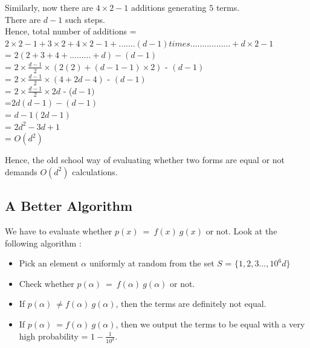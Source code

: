 \documentclass{llncs}
\begin{document}
Similarly, now there are $4 \times 2 -1$ additions generating $5$ terms. \\

There are $d-1$ such steps.\\

Hence, total number of additions = $2 \times 2 - 1 + 3 \times 2+ 4 \times 2 - 1 + .......(d-1) times................. + d \times 2 - 1   $\\

= $2 (2 + 3 + 4 + ......... + d ) - (d-1)$\\

= $2 \times \frac{d-1}{2} \times (2 (2) + (d-1-1) \times 2)$ - $(d-1)$\\

= $2 \times \frac{d-1}{2} \times (4 + 2d - 4)$ - $(d -1) $\\

= $2 \times \frac{d-1}{2} \times 2d$ - ($d -1) $\\

=$2 d (d - 1) - ( d - 1)$\\

= $ d - 1 ( 2d -1 )$\\

= $ 2 d^2 - 3d + 1$\\

= $O(d^2)$

Hence, the old school way of evaluating whether two forms are equal or not demands $O(d^2)$ calculations. 

\subsection{A Better Algorithm}

We have to evaluate whether $p(x)\ =\ f(x)\ g(x)$ or not. Look at the following algorithm : \\

\begin{itemize}
\item Pick an element $\alpha$ uniformly at random from the set $S$ = $\{1, 2, 3 ..., 10^6d\}$
\item Check whether $p(\alpha)\ =\ f(\alpha)\ g(\alpha)$ or not.
\item If $p(\alpha)\ \neq f(\alpha)\ g(\alpha)$, then the terms are definitely not equal. 
\item If $p(\alpha)\ = f(\alpha)\ g(\alpha)$, then we output the terms to be equal with a very high probability = $1 - \frac{1}{10^d}$.
\end{itemize}
\end{document}
